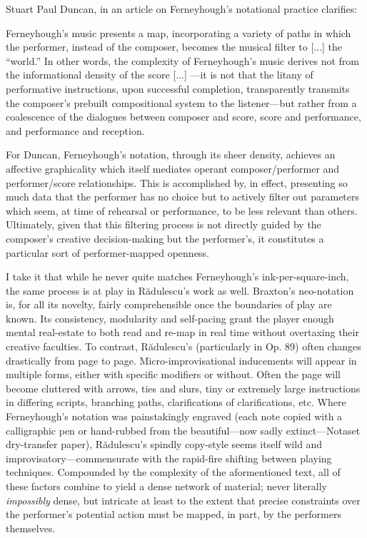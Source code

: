         Stuart Paul Duncan, in an article on Ferneyhough's notational practice clarifies:

        \begin{smallquote}
            [...] Ferneyhough's music presents a map, incorporating a variety of paths in which the performer, instead of the composer, becomes the musical filter to [...] the ``world.'' In other words, the complexity of Ferneyhough's music derives not from the informational density of the score [...] ---it is not that the litany of performative instructions, upon successful completion, transparently transmits the composer's prebuilt compositional system to the listener---but rather from a coalescence of the dialogues between composer and score, score and performance, and performance and reception. \autocite[138--9]{Duncan_2010}
        \end{smallquote}

        For Duncan, Ferneyhough's notation, through its sheer density, achieves an affective graphicality which itself mediates operant composer/performer and performer/score relationships. This is accomplished by, in effect, presenting so much data that the performer has no choice but to actively filter out parameters which seem, at time of rehearsal or performance, to be less relevant than others. Ultimately, given that this filtering process is not directly guided by the composer's creative decision-making but the performer's, it constitutes a particular sort of performer-mapped openness.
        
        I take it that while he never quite matches Ferneyhough's ink-per-square-inch, the same process is at play in R\u{a}dulescu's work as well. Braxton's neo-notation is, for all its novelty, fairly comprehensible once the boundaries of play are known. Its consistency, modularity and self-pacing grant the player enough mental real-estate to both read and re-map in real time without overtaxing their creative faculties. To contrast, R\u{a}dulescu's (particularly in Op. 89) often changes drastically from page to page. Micro-improvisational inducements will appear in multiple forms, either with specific modifiers or without. Often the page will become cluttered with arrows, ties and slurs, tiny or extremely large instructions in differing scripts, branching paths, clarifications of clarifications, etc. Where Ferneyhough's notation was painstakingly engraved (each note copied with a calligraphic pen or hand-rubbed from the beautiful---now sadly extinct---Notaset dry-transfer paper), R\u{a}dulescu's spindly copy-style seems itself wild and improvisatory---commensurate with the rapid-fire shifting between playing techniques. Compounded by the complexity of the aformentioned text, all of these factors combine to yield a dense network of material; never literally \textit{impossibly} dense, but intricate at least to the extent that precise constraints over the performer's potential action must be mapped, in part, by the performers themselves.


